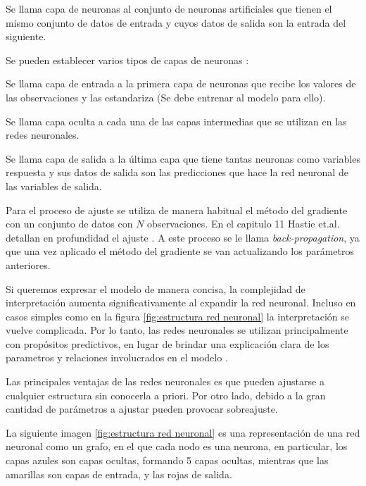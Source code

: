 \begin{defi}
Se llama capa de neuronas al conjunto de neuronas artificiales que tienen el mismo conjunto de datos de entrada y cuyos datos de salida son la entrada del siguiente.
\end{defi}
\noindent Se pueden establecer varios tipos de capas de neuronas \cite{Neural Designer}:
\begin{defi}
Se llama capa de entrada a la primera capa de neuronas que recibe los valores de las observaciones y las estandariza (Se debe entrenar al modelo para ello).
\end{defi}
\begin{defi}
Se llama capa oculta a cada una de las capas intermedias que se utilizan en las redes neuronales. 
\end{defi}

\begin{defi}
Se llama capa de salida a la última capa que tiene tantas neuronas como variables respuesta y sus datos de salida son las predicciones que hace la red neuronal de las variables de salida. 
\end{defi}

\noindent Para el proceso de ajuste se utiliza de manera habitual el método del gradiente con un conjunto de datos con $N$ observaciones. En el capitulo  11 Hastie et.al.  detallan en profundidad el ajuste \cite{Hastie 2001}. A este proceso se le llama \emph{back-propagation}, ya que una vez aplicado el método del gradiente se van actualizando los parámetros anteriores. 

\noindent Si queremos expresar el modelo de manera concisa, la complejidad de interpretación aumenta significativamente al expandir la red neuronal. Incluso en casos simples como en la figura  \ref{fig:estructura red neuronal} la interpretación se vuelve complicada. Por lo tanto, las redes neuronales se utilizan principalmente con propósitos predictivos, en lugar de brindar una explicación clara de los parametros y relaciones involucrados en el modelo \cite{Hastie 2001, James 2013}.

\noindent Las principales ventajas de las redes neuronales es que pueden ajustarse a cualquier estructura sin conocerla a priori. Por otro lado, debido a la gran cantidad de parámetros a ajustar pueden provocar sobreajuste.

\noindent La siguiente imagen \ref{fig:estructura red neuronal} es una representación de una red neuronal como un grafo, en el que cada nodo es una neurona, en particular, los capas azules son capas ocultas, formando 5 capas ocultas, mientras que las amarillas son capas de entrada, y las rojas de salida. 

